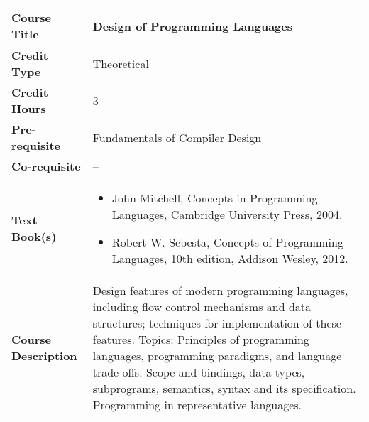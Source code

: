 \documentclass[11pt]{article}
\begin{document}
\begin{table}[h!]
\begin{tabular}{|l|l|}
\hline
\textbf{Course Title}       &   Design of Programming Languages\\ \hline
\textbf{Credit Type}        &   Theoretical \\ \hline
\textbf{Credit Hours}       &  3 \\ \hline
\textbf{Pre-requisite}       &  Fundamentals of Compiler Design \\ \hline
\textbf{Co-requisite}       &  -- \\ \hline
\textbf{Text Book(s)}       & \begin{minipage}{.70\textwidth}
\begin{itemize} \itemsep-0.4em
	\vspace{3mm}
	\item John Mitchell, Concepts in Programming Languages, Cambridge University Press, 2004.
	\item Robert W. Sebesta, Concepts of Programming Languages, 10th edition, Addison Wesley, 2012.
	\vspace{3mm}
\end{itemize}
\end{minipage}\\ \hline
\textbf{Course Description} & \begin{minipage}{.70\textwidth}
\vspace{3mm}
Design features of modern programming languages, including flow control
mechanisms and data structures; techniques for implementation of these features. Topics: Principles of programming languages, programming paradigms, and language trade-offs. Scope
and bindings, data types, subprograms, semantics, syntax and its specification. Programming in
representative languages.
\vspace{3mm}
\end{minipage} \\ \hline
\end{tabular}
\end{table}
\end{document}
